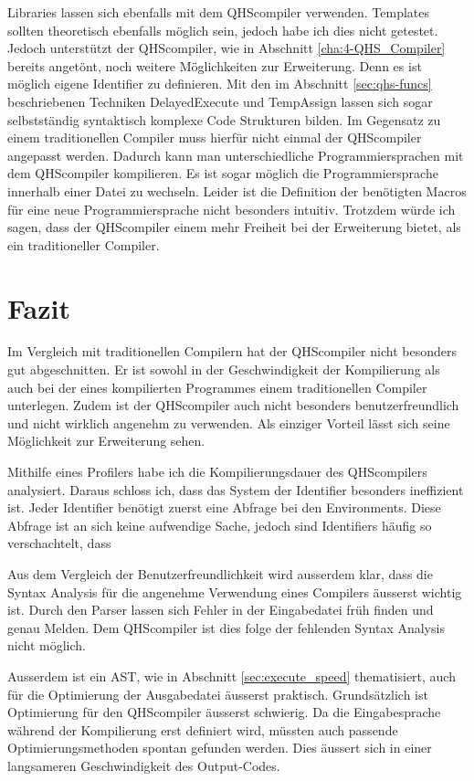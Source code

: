 Libraries lassen sich ebenfalls mit dem QHScompiler verwenden. Templates sollten theoretisch ebenfalls möglich sein, jedoch habe ich dies nicht getestet.
Jedoch unterstützt der QHScompiler, wie in Abschnitt \ref{cha:4-QHS_Compiler} bereits angetönt, noch weitere Möglichkeiten zur Erweiterung. 
Denn es ist möglich eigene Identifier zu definieren. Mit den im Abschnitt \ref{sec:qhs-funcs} beschriebenen Techniken DelayedExecute und TempAssign
lassen sich sogar selbstständig syntaktisch komplexe Code Strukturen bilden. Im Gegensatz zu einem traditionellen Compiler muss hierfür nicht einmal der QHScompiler angepasst werden.
Dadurch kann man unterschiedliche Programmiersprachen mit dem QHScompiler kompilieren. Es ist sogar möglich die Programmiersprache innerhalb einer Datei zu wechseln.
Leider ist die Definition der benötigten Macros für eine neue Programmiersprache nicht besonders intuitiv. 
Trotzdem würde ich sagen, dass der QHScompiler einem mehr Freiheit bei der Erweiterung bietet, als ein traditioneller Compiler.

\section{Fazit}
Im Vergleich mit traditionellen Compilern hat der QHScompiler nicht besonders gut abgeschnitten.
Er ist sowohl in der Geschwindigkeit der Kompilierung als auch bei der eines kompilierten Programmes einem traditionellen Compiler unterlegen.
Zudem ist der QHScompiler auch nicht besonders benutzerfreundlich und nicht wirklich angenehm zu verwenden. Als einziger Vorteil lässt sich seine Möglichkeit zur Erweiterung sehen.

Mithilfe eines Profilers habe ich die Kompilierungsdauer des QHScompilers analysiert. Daraus schloss ich, dass das System der Identifier besonders ineffizient ist. 
Jeder Identifier benötigt zuerst eine Abfrage bei den Environments. Diese Abfrage ist an sich keine aufwendige Sache, jedoch sind Identifiers häufig so verschachtelt, dass 

Aus dem Vergleich der Benutzerfreundlichkeit wird ausserdem klar, dass die Syntax Analysis für die angenehme Verwendung eines Compilers äusserst wichtig ist.
Durch den Parser lassen sich Fehler in der Eingabedatei früh finden und genau Melden. Dem QHScompiler ist dies folge der fehlenden Syntax Analysis nicht möglich.

Ausserdem ist ein AST, wie in Abschnitt \ref{sec:execute_speed} thematisiert, auch für die Optimierung der Ausgabedatei äusserst praktisch.
Grundsätzlich ist Optimierung für den QHScompiler äusserst schwierig. Da die Eingabesprache während der Kompilierung erst definiert wird, müssten auch passende Optimierungsmethoden spontan gefunden werden.
Dies äussert sich in einer langsameren Geschwindigkeit des Output-Codes.

